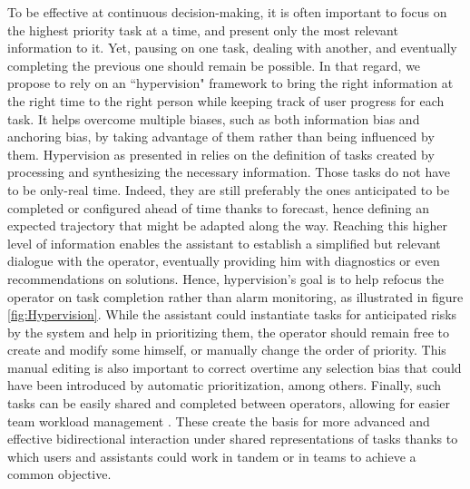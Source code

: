 \documentclass{IOS-Book-Article}
\begin{document}
To be effective at continuous decision-making, it is often important to focus on the highest priority task at a time, and present only the most relevant information to it. Yet, pausing on one task, dealing with another, and eventually completing the previous one should remain be possible. In that regard, we propose to rely on an ``hypervision" framework to bring the right information at the right time to the right person \cite{marot2022perspectives} while keeping track of user progress for each task. It helps overcome multiple biases, such as both information bias and anchoring bias, by taking advantage of them rather than being influenced by them. 
Hypervision as presented in \cite{marot2022perspectives} relies on the definition of tasks created by processing and synthesizing the necessary information. Those tasks do not have to be only-real time. Indeed, they are still preferably the ones anticipated to be completed or configured ahead of time thanks to forecast, hence defining an expected trajectory that might be adapted along the way. Reaching this higher level of information enables the assistant to establish a simplified but relevant dialogue with the operator, eventually providing him with diagnostics or even recommendations on solutions. Hence, hypervision's goal is to help refocus the operator on task completion rather than alarm monitoring, as illustrated in figure \ref{fig:Hypervision}. While the assistant could instantiate tasks for anticipated risks by the system and help in prioritizing them, the operator should remain free to create and modify some himself, or manually change the order of priority. This manual editing is also important to correct overtime any selection bias that could have been introduced by automatic prioritization, among others. Finally, such tasks can be easily shared and completed between operators, allowing for easier team workload management \cite{harbers2017value}. These create the basis for more advanced and effective bidirectional interaction under shared representations of tasks \cite{heer2019agency} thanks to which users and assistants could work in tandem or in teams to achieve a common objective.

\end{document}
